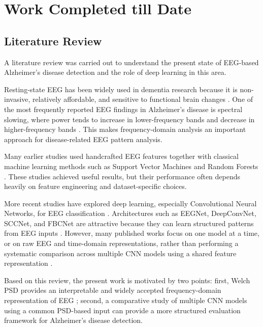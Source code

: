 \documentclass[12pt,a4paper]{article}
\begin{document}
\newpage

\section{Work Completed till Date}

\subsection{Literature Review}
A literature review was carried out to understand the present state of EEG-based Alzheimer’s disease detection and the role of deep learning in this area.

Resting-state EEG has been widely used in dementia research because it is non-invasive, relatively affordable, and sensitive to functional brain changes \cite{cassani2018,jeong2004,dauwels2010}. One of the most frequently reported EEG findings in Alzheimer’s disease is spectral slowing, where power tends to increase in lower-frequency bands and decrease in higher-frequency bands \cite{cassani2018,jeong2004,dauwels2010}. This makes frequency-domain analysis an important approach for disease-related EEG pattern analysis.

Many earlier studies used handcrafted EEG features together with classical machine learning methods such as Support Vector Machines and Random Forests \cite{cassani2018,tzimourta2019}. These studies achieved useful results, but their performance often depends heavily on feature engineering and dataset-specific choices.

More recent studies have explored deep learning, especially Convolutional Neural Networks, for EEG classification \cite{lawhern2018,schirrmeister2017,hsu2018,mane2021,roy2019,craik2019}. Architectures such as EEGNet, DeepConvNet, SCCNet, and FBCNet are attractive because they can learn structured patterns from EEG inputs \cite{lawhern2018,schirrmeister2017,hsu2018,mane2021}. However, many published works focus on one model at a time, or on raw EEG and time-domain representations, rather than performing a systematic comparison across multiple CNN models using a shared feature representation \cite{roy2019,craik2019}.

Based on this review, the present work is motivated by two points: first, Welch PSD provides an interpretable and widely accepted frequency-domain representation of EEG \cite{welch1967}; second, a comparative study of multiple CNN models using a common PSD-based input can provide a more structured evaluation framework for Alzheimer’s disease detection.
\end{document}
